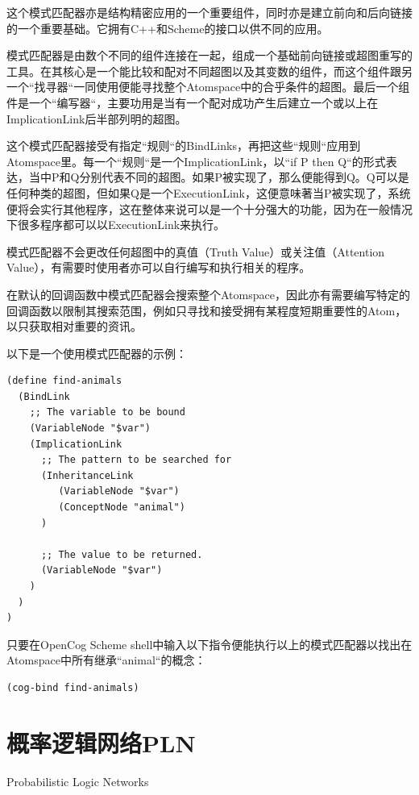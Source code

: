 这个模式匹配器亦是结构精密应用的一个重要组件，同时亦是建立前向和后向链接的一个重要基础。它拥有C++和Scheme的接口以供不同的应用。

模式匹配器是由数个不同的组件连接在一起，组成一个基础前向链接或超图重写的工具。在其核心是一个能比较和配对不同超图以及其变数的组件，而这个组件跟另一个“找寻器“一同使用便能寻找整个Atomspace中的合乎条件的超图。最后一个组件是一个“编写器“，主要功用是当有一个配对成功产生后建立一个或以上在ImplicationLink后半部列明的超图。

这个模式匹配器接受有指定“规则“的BindLinks，再把这些“规则“应用到Atomspace里。每一个“规则“是一个ImplicationLink，以“if P then Q“的形式表达，当中P和Q分别代表不同的超图。如果P被实现了，那么便能得到Q。Q可以是任何种类的超图，但如果Q是一个ExecutionLink，这便意味著当P被实现了，系统便将会实行其他程序，这在整体来说可以是一个十分强大的功能，因为在一般情况下很多程序都可以以ExecutionLink来执行。

模式匹配器不会更改任何超图中的真值（Truth Value）或关注值（Attention Value），有需要时使用者亦可以自行编写和执行相关的程序。

在默认的回调函数中模式匹配器会搜索整个Atomspace，因此亦有需要编写特定的回调函数以限制其搜索范围，例如只寻找和接受拥有某程度短期重要性的Atom，以只获取相对重要的资讯。

以下是一个使用模式匹配器的示例：

\begin{verbatim}
(define find-animals
  (BindLink
    ;; The variable to be bound
    (VariableNode "$var")
    (ImplicationLink
      ;; The pattern to be searched for
      (InheritanceLink
         (VariableNode "$var")
         (ConceptNode "animal")
      )
 
      ;; The value to be returned.
      (VariableNode "$var")
    )
  )
)
 \end{verbatim}
 
只要在OpenCog Scheme shell中输入以下指令便能执行以上的模式匹配器以找出在Atomspace中所有继承“animal“的概念：

\begin{verbatim}
(cog-bind find-animals)
\end{verbatim}


\section{概率逻辑网络PLN}{Probabilistic Logic Networks}
\label{sec:pln}

